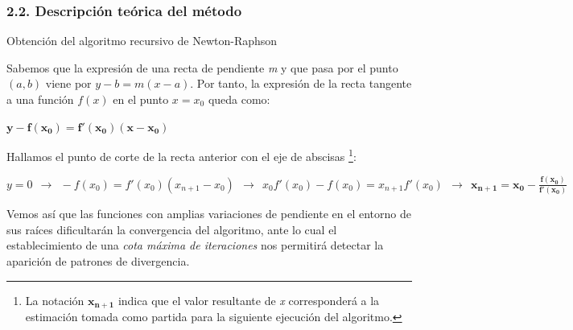 \documentclass{beamer}
\begin{document}
\begin{frame}
\frametitle{2.2. Descripción teórica del método}
\begin{block}{Obtención del algoritmo recursivo de Newton-Raphson}

Sabemos que la expresión de una recta de pendiente \emph{m} y que pasa por el punto $(a, b)$ 
viene por $ y - b = m (x - a)$. Por tanto, la expresión de la recta tangente a una función $f(x)$ 
en el punto $x = x_{0}$ queda como:
    \vspace*{-2mm}
    \begin{center}
    $\boldsymbol{y - f(x_{0}) = f'(x_{0}) (x - x_{0})}$
    \end{center}
    \vspace*{-2mm} \pause

Hallamos el punto de corte de la recta anterior con el eje de abscisas
\footnote{La notación $\boldsymbol{x_{n+1}}$ indica que el valor resultante de \emph{x} corresponderá 
a la estimación tomada como partida para la siguiente ejecución del algoritmo.}:
    \vspace*{-1mm}
    \begin{center}
    $y = 0 \ \ \to \ \ -f(x_{0}) = f'(x_{0}) (x_{n+1} - x_{0}) \ \ \to \ \ x_{0} f'(x_{0}) - f(x_{0}) 
    = x_{n+1} f'(x_{0}) \ \ \to \ \ \boldsymbol{x_{n+1} = x_{0} - \frac{f(x_{0})}{f'(x_{0})}}$
    \end{center}
    \vspace*{-1mm} \pause

Vemos así que las funciones con amplias variaciones de pendiente en el entorno de sus raíces 
dificultarán la convergencia del algoritmo, ante lo cual el establecimiento de una  \emph{cota 
máxima de iteraciones} nos permitirá detectar la aparición de patrones de divergencia.

\end{block}
\end{frame}

\end{document}
